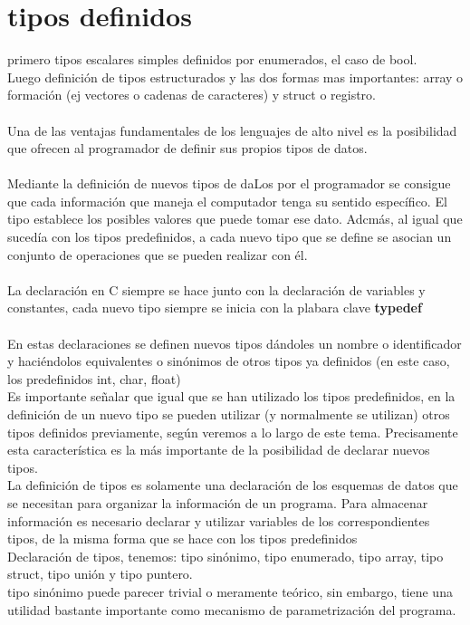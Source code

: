 \documentclass[11pt,a4paper]{article}
\begin{document}
  \section{tipos definidos}  
  primero tipos escalares simples definidos por enumerados, el caso de bool.\\
  Luego definición de tipos estructurados y las dos formas mas importantes: array o formación (ej vectores o cadenas de caracteres) y struct o registro.\\
  \\
  Una de las ventajas fundamentales de los lenguajes de alto nivel es la posibilidad que ofrecen al programador de definir sus propios tipos de datos.\\
  \\
  Mediante la definición de nuevos tipos de daLos por el programador se consigue
  que cada información que maneja el computador tenga su sentido específico.
  El tipo establece los posibles valores que puede tomar ese dato. Adcmás, al
  igual que sucedía con los tipos predefinidos, a cada nuevo tipo que se define se
  asocian un conjunto de operaciones que se pueden realizar con él.\\
  \\
  La declaración en C siempre se hace junto con la declaración de variables y constantes, cada nuevo tipo siempre se inicia con la plabara clave \textbf{typedef}\\
  \\
  En estas declaraciones se definen nuevos tipos dándoles un nombre o identificador y haciéndolos equivalentes o sinónimos de otros tipos ya definidos (en
  este caso, los predefinidos int, char, float)\\
  Es importante señalar que igual que se han utilizado los tipos predefinidos, en
  la definición de un nuevo tipo se pueden utilizar (y normalmente se utilizan)
  otros tipos definidos previamente, según veremos a lo largo de este tema.
  Precisamente esta característica es la más importante de la posibilidad de
  declarar nuevos tipos.\\
  La definición de tipos es solamente una declaración de los esquemas de datos que se necesitan para organizar la información de un programa. Para
  almacenar información es necesario declarar y utilizar variables de los correspondientes
  tipos, de la misma forma que se hace con los tipos predefinidos\\
  Declaración de tipos, tenemos: tipo sinónimo, tipo enumerado, tipo array, tipo struct, tipo unión y tipo puntero.\\
  tipo sinónimo puede parecer trivial o meramente teórico, sin embargo, tiene
  una utilidad bastante importante como mecanismo de parametrización del programa.
  
\end{document}
